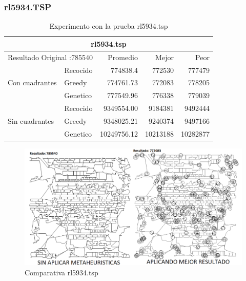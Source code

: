 \subsubsection{rl5934.TSP}
\begin{table}[hbtp]
 \centering 
	\begin{tabular}{ | l   l | r | r | r |   }
         \hline\multicolumn{5}{|c|}{ \rowcolor[gray]{0.8}rl5934.tsp} \\\hline
         \multicolumn{2}{|l|}{Resultado Original :785540}  & Promedio & Mejor & Peor \\ \hline
                        & Recocido  & 774838.4 & 772530 & 777479  \\ 
         Con cuadrantes & Greedy    & 774761.73 & 772083 & 778205  \\ 
                        & Genetico  & 777549.96 & 776338 & 779039  \\ \hline
                        & Recocido  & 9349554.00 & 9184381 & 9492444   \\ 
         Sin cuadrantes & Greedy    & 9348025.21 & 9240374 & 9497166   \\ 
                        & Genetico  & 10249756.12 & 10213188 & 10282877   \\ \hline
    \end{tabular}
    \caption{Experimento con la prueba rl5934.tsp}
    \label{table:EXP_rl5934.tsp}
\end{table}
\begin{figure}[hbtp]
    \centering
        \includegraphics[width=1\textwidth]{PruebasResultados/Experimentos_Comparativas/rl5934.png}
        \caption{Comparativa rl5934.tsp}
        \label{fig:rl5934_comparativa.png}
\end{figure}
